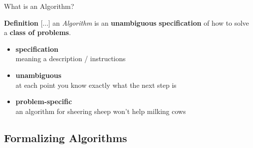 \begin{frame}{What is an Algorithm?}

    \begin{alertblock}{\textbf{Definition}}
        [...] an \textit{Algorithm} is an \textbf<3>{unambiguous} \textbf<2>{specification} of how to solve a \textbf<4>{class of problems}. 
    \end{alertblock}

    \begin{itemize}
        \item <2-> \textbf{specification} \\
        meaning a description / instructions

        \item <3-> \textbf{unambiguous} \\
        at each point you know exactly what the next step is

        \item <4-> \textbf{problem-specific} \\
        an algorithm for sheering sheep won't help milking cows
    \end{itemize}

    \vspace{0.5cm}


    \vspace{0.5cm}


\end{frame}

\subsection{Formalizing Algorithms}

